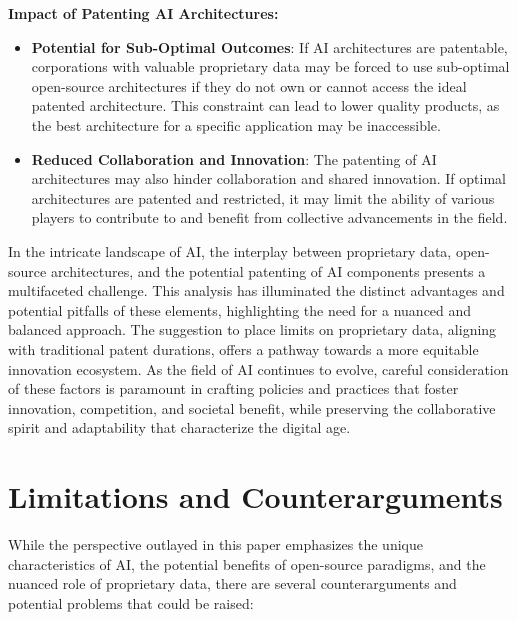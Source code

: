 \documentclass{article}[10pt]
\begin{document}
\noindent \textbf{Impact of Patenting AI Architectures:}

\begin{itemize}
	\item \textbf{Potential for Sub-Optimal Outcomes}: If AI architectures are patentable, corporations with valuable proprietary data may be forced to use sub-optimal open-source architectures if they do not own or cannot access the ideal patented architecture. This constraint can lead to lower quality products, as the best architecture for a specific application may be inaccessible.
	\item \textbf{Reduced Collaboration and Innovation}: The patenting of AI architectures may also hinder collaboration and shared innovation. If optimal architectures are patented and restricted, it may limit the ability of various players to contribute to and benefit from collective advancements in the field.
\end{itemize}

In the intricate landscape of AI, the interplay between proprietary data, open-source architectures, and the potential patenting of AI components presents a multifaceted challenge. This analysis has illuminated the distinct advantages and potential pitfalls of these elements, highlighting the need for a nuanced and balanced approach. The suggestion to place limits on proprietary data, aligning with traditional patent durations, offers a pathway towards a more equitable innovation ecosystem. As the field of AI continues to evolve, careful consideration of these factors is paramount in crafting policies and practices that foster innovation, competition, and societal benefit, while preserving the collaborative spirit and adaptability that characterize the digital age.

\section{Limitations and Counterarguments}

While the perspective outlayed in this paper emphasizes the unique characteristics of AI, the potential benefits of open-source paradigms, and the nuanced role of proprietary data, there are several counterarguments and potential problems that could be raised:
\end{document}
